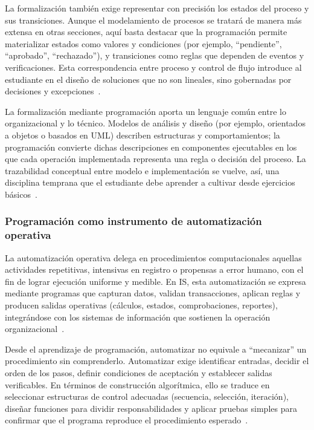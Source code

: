 \documentclass[12pt,twoside]{book}
\begin{document}
						La formalización también exige representar con precisión los estados del proceso y sus transiciones. Aunque el modelamiento de procesos se tratará de manera más extensa en otras secciones, aquí basta destacar que la programación permite materializar estados como valores y condiciones (por ejemplo, “pendiente”, “aprobado”, “rechazado”), y transiciones como reglas que dependen de eventos y verificaciones. Esta correspondencia entre proceso y control de flujo introduce al estudiante en el diseño de soluciones que no son lineales, sino gobernadas por decisiones y excepciones~\cite{Kendall2014Systems,Tegarden2025Systems,Wirth1976Algorithms}.
						
						La formalización mediante programación aporta un lenguaje común entre lo organizacional y lo técnico. Modelos de análisis y diseño (por ejemplo, orientados a objetos o basados en UML) describen estructuras y comportamientos; la programación convierte dichas descripciones en componentes ejecutables en los que cada operación implementada representa una regla o decisión del proceso. La trazabilidad conceptual entre modelo e implementación se vuelve, así, una disciplina temprana que el estudiante debe aprender a cultivar desde ejercicios básicos~\cite{Booch2007Object,Ghezzi2003Fundamentals,Tegarden2025Systems}.
						
					\subsubsection{Programación como instrumento de automatización operativa}
						\noindent
						La automatización operativa delega en procedimientos computacionales aquellas actividades repetitivas, intensivas en registro o propensas a error humano, con el fin de lograr ejecución uniforme y medible. En IS, esta automatización se expresa mediante programas que capturan datos, validan transacciones, aplican reglas y producen salidas operativas (cálculos, estados, comprobaciones, reportes), integrándose con los sistemas de información que sostienen la operación organizacional~\cite{Laudon2020Management,Kendall2014Systems,Gonzalez-Longatt2007Introduccion}.
						
						Desde el aprendizaje de programación, automatizar no equivale a “mecanizar” un procedimiento sin comprenderlo. Automatizar exige identificar entradas, decidir el orden de los pasos, definir condiciones de aceptación y establecer salidas verificables. En términos de construcción algorítmica, ello se traduce en seleccionar estructuras de control adecuadas (secuencia, selección, iteración), diseñar funciones para dividir responsabilidades y aplicar pruebas simples para confirmar que el programa reproduce el procedimiento esperado~\cite{Hanly2015Problem,Gaddis2022Starting,Wirth1976Algorithms}.
						
\end{document}
